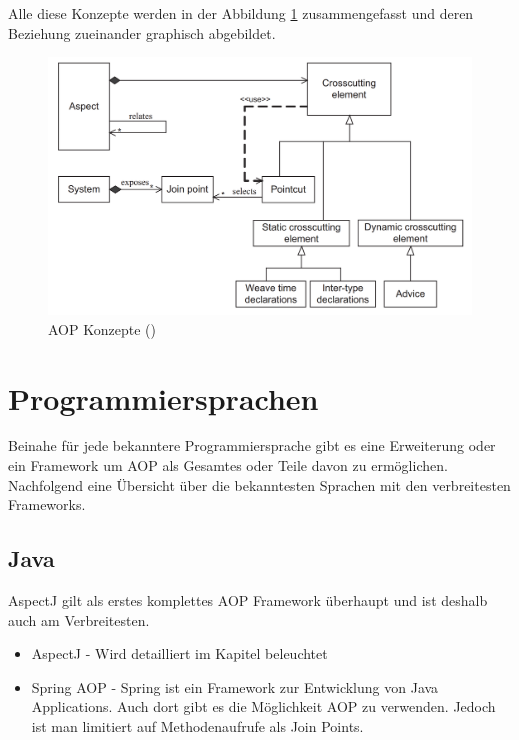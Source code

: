 Alle diese Konzepte werden in der Abbildung \ref{fig:concepts} zusammengefasst und deren Beziehung zueinander graphisch abgebildet.

\begin{figure}[H]
	\centering
		\includegraphics[scale=0.5]{bilder/concepts}
	\caption{AOP Konzepte (\cite[p~60]{laddad:aspectj})}
	\label{fig:concepts}
\end{figure}
\newpage

\section{Programmiersprachen}

Beinahe für jede bekanntere Programmiersprache gibt es eine Erweiterung oder ein Framework um AOP als Gesamtes oder Teile davon zu ermöglichen. Nachfolgend eine Übersicht über die bekanntesten Sprachen mit den verbreitesten Frameworks.

\subsection{Java}

AspectJ gilt als erstes komplettes AOP Framework überhaupt und ist deshalb auch am Verbreitesten.

\begin{itemize}
\item AspectJ - Wird detailliert im Kapitel  beleuchtet
\item Spring AOP - Spring ist ein Framework zur Entwicklung von Java Applications. Auch dort gibt es die Möglichkeit AOP zu verwenden. Jedoch ist man limitiert auf Methodenaufrufe als Join Points.
\end{itemize}

